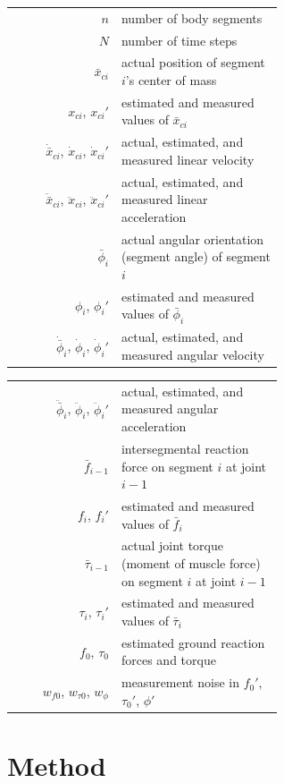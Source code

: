 \documentclass[11pt]{article}
\begin{document}
\begin{center}\small
\begin{minipage}[t]{0.48\textwidth}
\begin{tabular}[t]{@{}r@{${}={}$}p{0.6\linewidth}@{}}
$n$ & number of body segments\\
$N$ & number of time steps\\
$\bar{x}_{ci}$ & actual position of segment $i$'s center of mass\\
$x_{ci}$, $x_{ci}'$ & estimated and measured values of $\bar{x}_{ci}$\\
$\dot{\bar{x}}_{ci}$, $\dot{x}_{ci}$, $\dot{x}_{ci}'$ & actual, estimated,
and measured linear velocity\\
$\ddot{\bar{x}}_{ci}$, $\ddot{x}_{ci}$, $\ddot{x}_{ci}'$ & actual, estimated,
and measured linear acceleration\\
$\bar{\phi}_i$ & actual angular orientation (segment angle) of segment $i$\\
$\phi_i$, $\phi_i'$ & estimated and measured values of $\bar{\phi}_i$\\
$\dot{\bar{\phi}}_i$, $\dot{\phi}_i$, $\dot{\phi}_i'$ & actual, estimated, and
measured angular velocity
\end{tabular}
\end{minipage}\hfill
\begin{minipage}[t]{0.48\textwidth}
\begin{tabular}[t]{@{}r@{${}={}$}p{0.6\linewidth}@{}}
$\ddot{\bar{\phi}}_i$, $\ddot{\phi}_i$, $\ddot{\phi}_i'$ & actual, estimated,
and measured angular acceleration\\
$\bar{f}_{i-1}$ & intersegmental reaction force on segment $i$ at joint $i-1$\\
$f_i$, $f_i'$ & estimated and measured values of $\bar{f}_i$\\
$\bar{\tau}_{i-1}$ & actual joint torque (moment of muscle force) on segment
$i$ at joint $i-1$\\
$\tau_i$, $\tau_i'$ & estimated and measured values of $\bar{\tau}_i$\\
$f_0$, $\tau_0$ & estimated ground reaction forces and torque\\
$w_{f0}$, $w_{\tau0}$, $w_{\phi}$ & measurement noise in $f_0'$, $\tau_0'$,
$\phi'$
\end{tabular}
\end{minipage}
\end{center}

\section*{Method}
\end{document}
